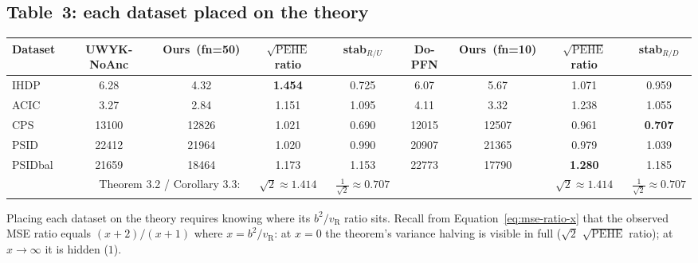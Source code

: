 \documentclass[11pt]{article}
\theoremstyle{remark}
\begin{document}
\subsection{Table~3: each dataset placed on the theory}
\label{subsec:table3-obs}

\begin{center}
\begin{tabular}{lcccccccc}
\toprule
Dataset & UWYK-NoAnc & Ours~(fn=50) & $\sqrt{\text{PEHE}}$ ratio & stab$_{\!R/U}$
        & Do-PFN     & Ours~(fn=10) & $\sqrt{\text{PEHE}}$ ratio & stab$_{\!R/D}$ \\
\midrule
IHDP     & 6.28   & 4.32   & \textbf{1.454} & 0.725
         & 6.07   & 5.67   & 1.071          & 0.959 \\
ACIC     & 3.27   & 2.84   & 1.151          & 1.095
         & 4.11   & 3.32   & 1.238          & 1.055 \\
CPS      & 13100  & 12826  & 1.021          & 0.690
         & 12015  & 12507  & 0.961          & \textbf{0.707} \\
PSID     & 22412  & 21964  & 1.020          & 0.990
         & 20907  & 21365  & 0.979          & 1.039 \\
PSIDbal  & 21659  & 18464  & 1.173          & 1.153
         & 22773  & 17790  & \textbf{1.280} & 1.185 \\
\midrule
\multicolumn{3}{r}{Theorem 3.2 / Corollary 3.3:}
& $\sqrt{2}{\approx}1.414$ & $\tfrac{1}{\sqrt{2}}{\approx}0.707$
& & & $\sqrt{2}{\approx}1.414$ & $\tfrac{1}{\sqrt{2}}{\approx}0.707$ \\
\bottomrule
\end{tabular}
\end{center}

Placing each dataset on the theory requires knowing where its
$b^2/v_{\mathrm{R}}$ ratio sits. Recall from
Equation~\eqref{eq:mse-ratio-x} that the observed MSE ratio equals
$(x+2)/(x+1)$ where $x = b^2/v_{\mathrm{R}}$: at $x = 0$ the
theorem's variance halving is visible in full ($\sqrt{2}$
$\sqrt{\mathrm{PEHE}}$ ratio); at $x \to \infty$ it is hidden ($1$).
\end{document}
